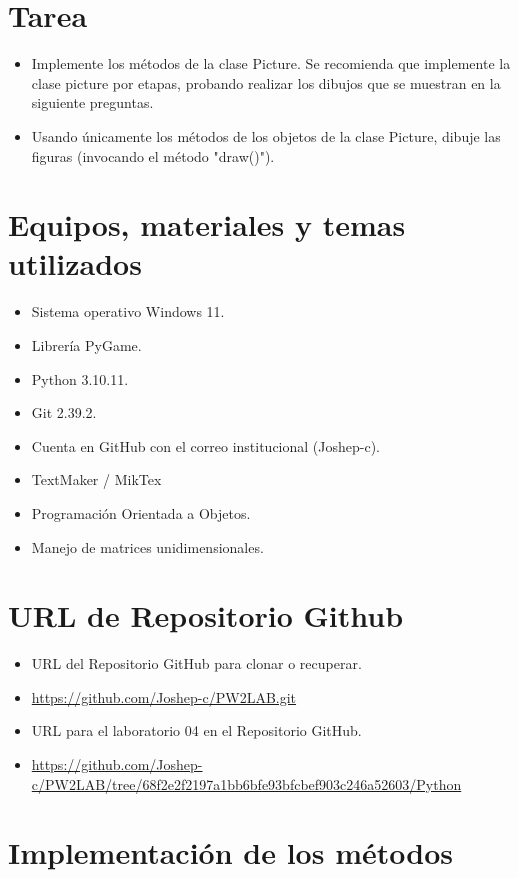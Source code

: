 \documentclass{article}
\begin{document}
	\section{Tarea}
	\begin{itemize}		
		\item Implemente los métodos de la clase Picture. Se recomienda que implemente la clase picture por etapas, probando realizar los dibujos que se muestran en la siguiente preguntas.
		\item Usando únicamente los métodos de los objetos de la clase Picture, dibuje las figuras (invocando el método "draw()").
	\end{itemize}
		
	\section{Equipos, materiales y temas utilizados}
	\begin{itemize}
		\item Sistema operativo Windows 11.
		\item Librería PyGame.
		\item Python 3.10.11.
		\item Git 2.39.2.
		\item Cuenta en GitHub con el correo institucional (Joshep-c).
		\item TextMaker / MikTex
		\item Programación Orientada a Objetos.
		\item Manejo de matrices unidimensionales.
	\end{itemize}
	
	\section{URL de Repositorio Github}
	\begin{itemize}
		\item URL del Repositorio GitHub para clonar o recuperar.
		\item \url{https://github.com/Joshep-c/PW2LAB.git}
		\item URL para el laboratorio 04 en el Repositorio GitHub.
		\item \url{https://github.com/Joshep-c/PW2LAB/tree/68f2e2f2197a1bb6bfe93bfcbef903c246a52603/Python}
	\end{itemize}
	
	\section{Implementación de los métodos}
	
\end{document}
